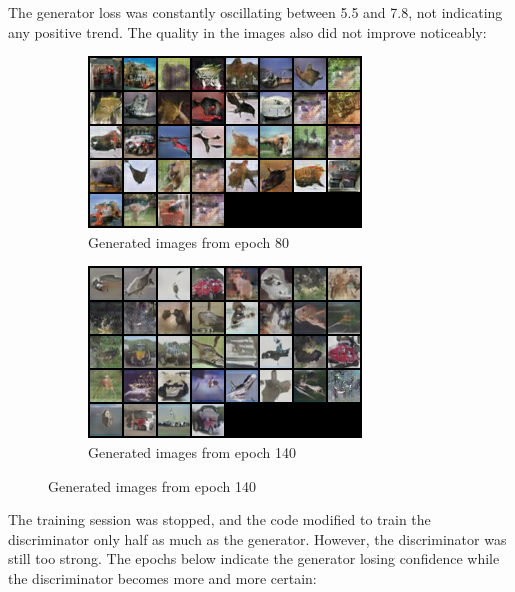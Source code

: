 The generator loss was constantly oscillating between 5.5 and 7.8, not indicating any positive trend. The quality in the images also did not improve noticeably:
\begin{figure}[H]
    \centering
    \begin{subfigure}[t]{0.48\textwidth}
        \centering
        \includegraphics[width=\textwidth]{images/ex_2/try_1/epoch_80}
        \caption{Generated images from epoch 80}
    \end{subfigure}
    \begin{subfigure}[t]{0.48\textwidth}
        \centering
        \includegraphics[width=\textwidth]{images/ex_2/try_1/epoch_140}
        \caption{Generated images from epoch 140}
    \end{subfigure}
    \hfill
\end{figure}
The training session was stopped, and the code modified to train the discriminator only half as much as the generator. However, the discriminator was still too strong. The epochs below indicate the generator losing confidence while the discriminator becomes more and more certain: \\
